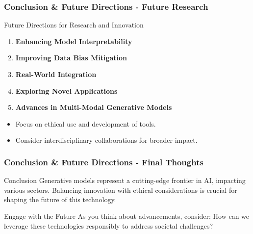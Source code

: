 \documentclass[aspectratio=169]{beamer}
\begin{document}
\begin{frame}[fragile]
  \frametitle{Conclusion \& Future Directions - Future Research}
  \begin{block}{Future Directions for Research and Innovation}
    \begin{enumerate}
      \item \textbf{Enhancing Model Interpretability}
      \item \textbf{Improving Data Bias Mitigation}
      \item \textbf{Real-World Integration}
      \item \textbf{Exploring Novel Applications}
      \item \textbf{Advances in Multi-Modal Generative Models}
    \end{enumerate}
  \end{block}
  \begin{itemize}
    \item Focus on ethical use and development of tools.
    \item Consider interdisciplinary collaborations for broader impact.
  \end{itemize}
\end{frame}

\begin{frame}[fragile]
  \frametitle{Conclusion \& Future Directions - Final Thoughts}
  \begin{block}{Conclusion}
    Generative models represent a cutting-edge frontier in AI, impacting various sectors. Balancing innovation with ethical considerations is crucial for shaping the future of this technology.
  \end{block}
  
  \begin{block}{Engage with the Future}
    As you think about advancements, consider: How can we leverage these technologies responsibly to address societal challenges?
  \end{block}
\end{frame}
\end{document}
